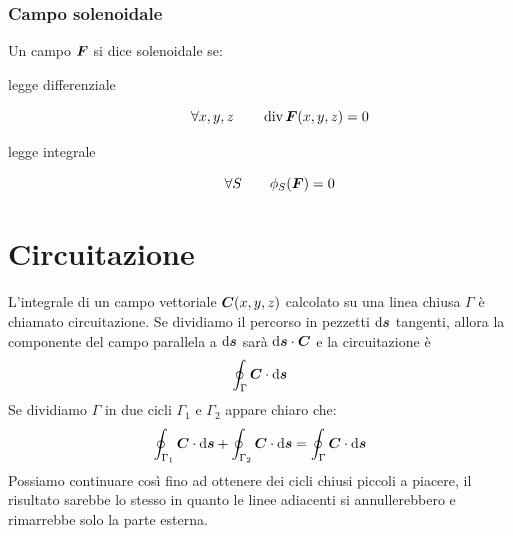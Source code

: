 \subsubsection{Campo solenoidale}
Un campo $\boldsymbol{F}$ si dice solenoidale se:
\begin{description}
\item[legge differenziale]\begin{equation*}\forall x,y,z\qquad \operatorname{div}\boldsymbol{F}(x,y,z)=0\end{equation*}
\item[legge integrale]\begin{equation*}\forall S \qquad\phi_S(\boldsymbol{F})=0\end{equation*}
\end{description}
\section{Circuitazione}
L'integrale di un campo vettoriale $\boldsymbol{C}(x,y,z)$ calcolato su una linea chiusa $\Gamma$ è chiamato circuitazione. Se dividiamo il percorso in pezzetti $\mathrm{d} \boldsymbol{s}$ tangenti, allora la componente del campo parallela a $\mathrm{d} \boldsymbol{s}$ sarà $\mathrm{d} \boldsymbol{s}\cdot \boldsymbol{C}$ e la circuitazione è 
\begin{equation}
\oint_\Gamma \boldsymbol{C}\cdot\mathrm{d}\boldsymbol{s}
\end{equation}
Se dividiamo  $\Gamma$ in due cicli $\Gamma_1$ e $\Gamma_2$ appare chiaro che:
\begin{equation*}\oint_{\Gamma_1} \boldsymbol{C}\cdot\mathrm{d} \boldsymbol{s}+\oint_{\Gamma_2} \boldsymbol{C}\cdot\mathrm{d}\boldsymbol{s}=\oint_\Gamma\boldsymbol{C}\cdot\mathrm{d}\boldsymbol{s}\end{equation*}
Possiamo continuare così fino ad ottenere dei cicli chiusi piccoli a piacere, il risultato sarebbe lo stesso in quanto le linee adiacenti si annullerebbero e rimarrebbe solo la parte esterna.
